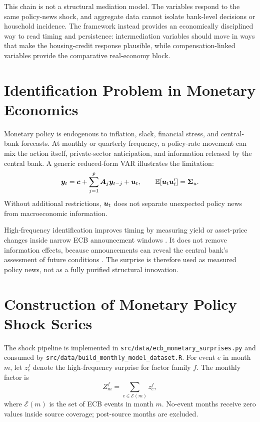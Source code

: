 This chain is not a structural mediation model. The variables respond to the same policy-news shock, and aggregate data cannot isolate bank-level decisions or household incidence. The framework instead provides an economically disciplined way to read timing and persistence: intermediation variables should move in ways that make the housing-credit response plausible, while compensation-linked variables provide the comparative real-economy block.

\section{Identification Problem in Monetary Economics}

Monetary policy is endogenous to inflation, slack, financial stress, and central-bank forecasts. At monthly or quarterly frequency, a policy-rate movement can mix the action itself, private-sector anticipation, and information released by the central bank. A generic reduced-form VAR illustrates the limitation:
\begin{equation}
  \bm{y}_t
  =
  \bm{c}
  +
  \sum_{j=1}^{p}\bm{A}_j\bm{y}_{t-j}
  +
  \bm{u}_t,
  \qquad
  \operatorname{\mathbb{E}}[\bm{u}_t\bm{u}_t^{\prime}]=\bm{\Sigma}_u .
  \label{eq:reduced-form-var}
\end{equation}
Without additional restrictions, \(\bm{u}_t\) does not separate unexpected policy news from macroeconomic information.

High-frequency identification improves timing by measuring yield or asset-price changes inside narrow ECB announcement windows \parencite{Kuttner2001,GertlerKaradi2015,NakamuraSteinsson2018,Altavilla2019}. It does not remove information effects, because announcements can reveal the central bank's assessment of future conditions \parencite{JarocinskiKaradi2020}. The surprise is therefore used as measured policy news, not as a fully purified structural innovation.

\section{Construction of Monetary Policy Shock Series}

The shock pipeline is implemented in \nolinkurl{src/data/ecb_monetary_surprises.py} and consumed by \nolinkurl{src/data/build_monthly_model_dataset.R}. For event \(e\) in month \(m\), let \(z^{f}_{e}\) denote the high-frequency surprise for factor family \(f\). The monthly factor is
\begin{equation}
  Z^{f}_{m}
  =
  \sum_{e \in \mathcal{E}(m)} z^{f}_{e},
  \label{eq:monthly-shock-aggregation}
\end{equation}
where \(\mathcal{E}(m)\) is the set of ECB events in month \(m\). No-event months receive zero values inside source coverage; post-source months are excluded.

